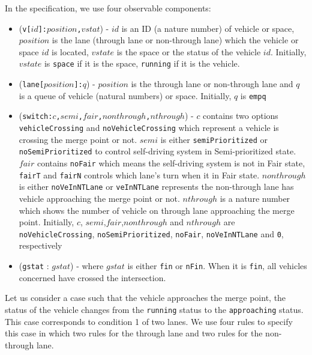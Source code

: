 \documentclass[10pt, conference, compsocconf]{IEEEtran}
\begin{document}
In the specification, we use four observable components:
\begin{itemize}
    \item (\verb!v[!$id$\verb!]:!$position$\verb!,!$vstat$) - $id$ is an ID (a nature number) of vehicle or space, $position$ is the lane (through lane or non-through lane) which the vehicle or space $id$ is located, $vstate$ is the space or the status of the vehicle $id$. Initially, $vstate$ is \verb!space! if it is the space, \verb!running! if it is the vehicle.
    \item (\verb!lane[!$position$\verb!]:!$q$) - $position$ is the through lane or non-through lane and $q$ is a queue of vehicle (natural numbers) or space. Initially, $q$ is \verb!empq!
    \item (\verb!switch:!$c$\verb!,!$semi$\verb!,!$fair$\verb!,!$nonthrough$\verb!,!$nthrough$) - $c$ contains two options \verb!vehicleCrossing! and \verb!noVehicleCrossing! which represent a vehicle is crossing the merge point or not. 
    $semi$ is either \verb!semiPrioritized! or \verb!noSemiPrioritized! to control self-driving system in Semi-prioritized state. 
    $fair$ contains \verb!noFair! which means the self-driving system is not in Fair state, \verb!fairT! and \verb!fairN! controls which lane's turn when it in Fair state. 
    $nonthrough$ is either \verb!noVeInNTLane! or \verb!veInNTLane! represents the non-through lane has vehicle approaching the merge point or not. 
    $nthrough$ is a nature number which shows the number of vehicle on through lane approaching the merge point.
    Initially, $c$, $semi$,$fair$,$nonthrough$ and $nthrough$ are \verb!noVehicleCrossing!, \verb!noSemiPrioritized!, \verb!noFair!, \verb!noVeInNTLane! and \verb!0!, respectively 
    \item (\verb!gstat! : $gstat$) -  where $gstat$ is either \verb!fin! or \verb!nFin!.
	When it is \verb!fin!, all vehicles concerned have crossed the intersection.
\end{itemize}

Let us consider a case such that the vehicle approaches the merge point, the status of the vehicle changes from the \verb!running! status to the \verb!approaching! status. 
This case corresponds to condition 1 of two lanes.
We use four rules to specify this case in which
two rules for the through lane and two rules for the non-through lane.
\end{document}
